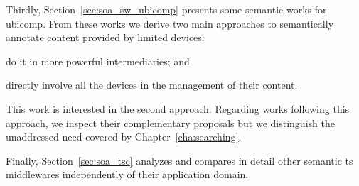 Thirdly, Section~\ref{sec:soa_sw_ubicomp} presents some semantic works for \ac{ubicomp}.
From these works we derive two main approaches to semantically annotate content provided by limited devices:
\begin{enumerate*}[label=\itshape\alph*\upshape)]
  \item do it in more powerful intermediaries; and
  \item directly involve all the devices in the management of their content.
\end{enumerate*}
This work is interested in the second approach.
Regarding works following this approach, we inspect their complementary proposals but we distinguish the unaddressed need covered by Chapter~\ref{cha:searching}. %


Finally, Section~\ref{sec:soa_tsc} analyzes and compares in detail other semantic \ac{ts} middlewares independently of their application domain.











